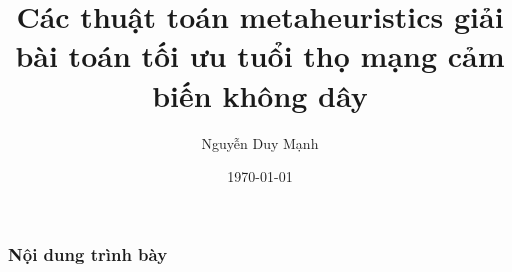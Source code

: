 \documentclass{beamer}
\title[]{Các thuật toán metaheuristics giải bài toán tối ưu tuổi thọ mạng cảm  biến không dây} %
\author{Nguyễn Duy Mạnh} %
\institute[HUST] %
{
Hanoi University of Sciences and Technology \\ %
\medskip
\textit{nguyenduymanhbk59@gmail.com} %
}
\date{\today} %
\begin{document}


\begin{frame}
\frametitle{Nội dung trình bày} %
\tableofcontents %
\end{frame}


% 
% 
% 

% 
\end{document}
